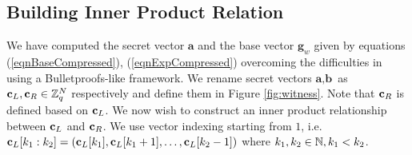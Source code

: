 \subsection{Building Inner Product Relation}

We have computed the secret vector $\textbf{a}$ and the base vector $\textbf{g}_w$ given by equations (\ref{eqnBaseCompressed}), (\ref{eqnExpCompressed}) overcoming the difficulties in using a Bulletproofs-like framework.
We rename secret vectors $\textbf{a}, \textbf{b}$ as $\textbf{c}_L, \textbf{c}_R \in \mathbb{Z}_q^N$ respectively and define them in Figure \ref{fig:witness}.
Note that $\textbf{c}_R$ is defined based on $\textbf{c}_L$. We now wish to construct an inner product relationship between $\textbf{c}_L$ and $\textbf{c}_R$.
We use vector indexing starting from $1$, i.e. $\textbf{c}_L[k_1:k_2] = (\textbf{c}_L[k_1], \textbf{c}_L[k_1+1], \dots, \textbf{c}_L[k_2-1])$ where $k_1, k_2 \in \mathbb{N}, k_1 < k_2$. 
